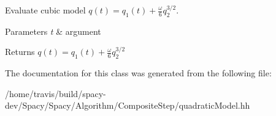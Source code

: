 Evaluate cubic model $ q(t) = q_1(t) + \frac{\omega}{6}q_2^{3/2} $. 


\begin{DoxyParams}{Parameters}
{\em t} & argument \\
\hline
\end{DoxyParams}
\begin{DoxyReturn}{Returns}
$ q(t) = q_1(t) + \frac{\omega}{6}q_2^{3/2} $ 
\end{DoxyReturn}


The documentation for this class was generated from the following file\-:\begin{DoxyCompactItemize}
\item 
/home/travis/build/spacy-\/dev/\-Spacy/\-Spacy/\-Algorithm/\-Composite\-Step/quadratic\-Model.\-hh\end{DoxyCompactItemize}
